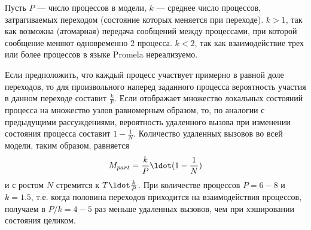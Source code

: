 Пусть $P$ — число процессов в модели, $k$ — среднее число процессов,
затрагиваемых переходом (состояние которых меняется при переходе). $k
> 1$, так как возможна (атомарная) передача сообщений между
процессами, при которой сообщение меняют одновременно 2 процесса. $k <
2$, так как взаимодействие трех или более процессов в языке Promela
нереализуемо.

Если предположить, что каждый процесс участвует примерно в равной доле
переходов, то для произвольного наперед заданного процесса вероятность
участия в данном переходе составит $\frac{k}{P}$. Если
 отображает множество локальных состояний процесса на
множество узлов равномерным образом, то, по аналогии с предыдущими
рассуждениями, вероятность удаленного вызова при изменении состояния
процесса составит $1 - \frac{1}{N}$. Количество удаленных вызовов во
всей модели, таким образом, равняется
\begin{equation}
  \label{eq:nmsg-firstproc-hash}
  M_{part} = \frac{k}{P} \ldot (1 - \frac{1}{N})
\end{equation}
и с ростом $N$ стремится к $T \ldot \frac{k}{P}$. При
количестве процессов $P = 6-8$ и $k = 1.5$, т.е. когда половина переходов
приходится на взаимодействия процессов, получаем в $P/k = 4-5$ раз
меньше удаленных вызовов, чем при хэшировании состояния целиком.

